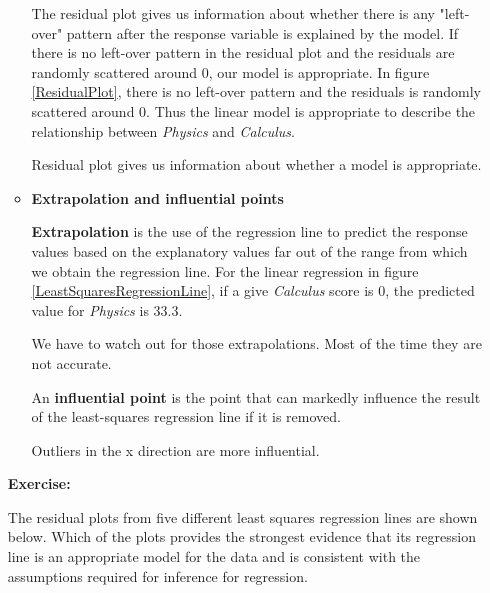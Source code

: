 \documentclass[a4paper, 12pt,twoside]{book}
\begin{document}
\begin{itemize}
\begin{itemize}[leftmargin = 0cm]
The residual plot gives us information about whether there is any "left-over" pattern after the response variable is explained by the model. If there is no left-over pattern in the residual plot and the residuals are randomly scattered around 0, our model is appropriate. In figure \ref{ResidualPlot}, there is no left-over pattern and the residuals is randomly scattered around 0. Thus the linear model is appropriate to describe the relationship between \textit{Physics} and \textit{Calculus}.
\vspace{0.6cm}

\colorbox{babypink}{\parbox{0.9\textwidth}{Residual plot gives us information about whether a model is appropriate.}}\vspace{0.6cm}

\item \textbf{Extrapolation  and influential points}\vspace{0.3cm}

\textbf{Extrapolation} is the use of the regression line to predict the response values based on the explanatory values far out of the range from which we obtain the regression line. For the linear regression in figure \ref{LeastSquaresRegressionLine}, if a give \textit{Calculus} score is 0, the predicted value for \textit{Physics} is 33.3. \vspace{0.3cm}

\colorbox{babypink}{\parbox{0.9\textwidth}{We have to watch out for those extrapolations. Most of the time they are not accurate.}}
\vspace{0.6cm}

An \textbf{influential point} is the point that can markedly influence the result of the least-squares regression line if it is removed.\vspace{0.3cm}

\colorbox{babypink}{\parbox{12.2cm}{Outliers in the x direction are more influential.}}\vspace{0.6cm}
\end{itemize}

\newpage

\hspace{-1.5cm}
\colorbox{champagne}{
\begin{minipage}{\textwidth}
\textbf{Exercise:}

The residual plots from five different least squares regression lines are shown below. Which of the plots provides the strongest evidence that its regression line is an appropriate model for the data and is consistent with the assumptions required for inference for regression.


\end{minipage}}
\end{itemize}
\end{document}
